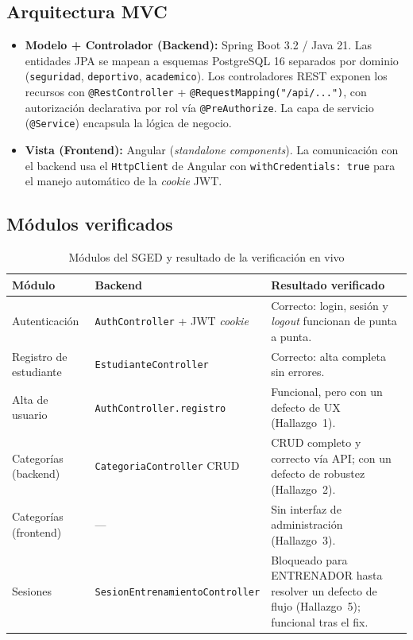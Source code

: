 \documentclass[12pt,a4paper]{article}
\begin{document}
\subsection{Arquitectura MVC}

\begin{itemize}
  \item \textbf{Modelo + Controlador (Backend):} Spring Boot 3.2 / Java 21. Las entidades JPA
    se mapean a esquemas PostgreSQL 16 separados por dominio
    (\texttt{seguridad}, \texttt{deportivo}, \texttt{academico}). Los controladores REST
    exponen los recursos con \texttt{@RestController} + \texttt{@RequestMapping("/api/...")},
    con autorización declarativa por rol vía \texttt{@PreAuthorize}. La capa de servicio
    (\texttt{@Service}) encapsula la lógica de negocio.
  \item \textbf{Vista (Frontend):} Angular (\textit{standalone components}). La comunicación
    con el backend usa el \texttt{HttpClient} de Angular con \texttt{withCredentials: true}
    para el manejo automático de la \textit{cookie} JWT.
\end{itemize}

\subsection{Módulos verificados}

\begin{table}[h!]
  \centering
  \caption{Módulos del SGED y resultado de la verificación en vivo}
  \label{tab:modulos}
  \begin{tabularx}{\linewidth}{@{}lL{4cm}L{5.5cm}@{}}
    \toprule
    \textbf{Módulo} & \textbf{Backend} & \textbf{Resultado verificado} \\
    \midrule
    Autenticación    & \texttt{AuthController} + JWT \textit{cookie} & Correcto: login, sesión y \textit{logout} funcionan de punta a punta. \\
    Registro de estudiante & \texttt{EstudianteController}         & Correcto: alta completa sin errores. \\
    Alta de usuario  & \texttt{AuthController.registro}             & Funcional, pero con un defecto de UX (Hallazgo~1). \\
    Categorías (backend) & \texttt{CategoriaController} CRUD        & CRUD completo y correcto vía API; con un defecto de robustez (Hallazgo~2). \\
    Categorías (frontend) & --- & Sin interfaz de administración (Hallazgo~3). \\
    Sesiones         & \texttt{SesionEntrenamientoController}       & Bloqueado para ENTRENADOR hasta resolver un defecto de flujo (Hallazgo~5); funcional tras el fix. \\
    \bottomrule
  \end{tabularx}
\end{table}
\end{document}
